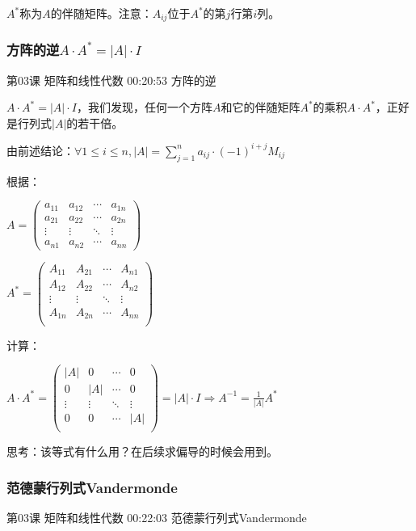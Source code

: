 \documentclass[UTF8]{ctexbook}
\begin{document}
$A^{*}$称为$A$的伴随矩阵。注意：$A_{ij}$位于$A^{*}$的第$j$行第$i$列。

\subsubsection{方阵的逆$A \cdot A^{*} = |A| \cdot I$}

第03课 矩阵和线性代数 00:20:53 方阵的逆

$A \cdot A^{*} = |A| \cdot I$，我们发现，任何一个方阵$A$和它的伴随矩阵$A^{*}$的乘积$A \cdot A^{*}$，正好是行列式$|A|$的若干倍。


由前述结论：$\forall 1 \leq i \leq n, |A|= \sum_{j=1}^{n} a_{ij} \cdot (-1)^{i+j} M_{ij}$

根据：

$A=
\begin{pmatrix}
a_{11} & a_{12} & \cdots & a_{1n} \\
a_{21} & a_{22}  & \cdots & a_{2n} \\
\vdots & \vdots  & \ddots & \vdots \\
a_{n1} & a_{n2}  & \cdots & a_{nn}
\end{pmatrix}$ \quad

$A^{*}=
\begin{pmatrix}
A_{11} & A_{21} & \cdots & A_{n1} \\
A_{12} & A_{22} & \cdots & A_{n2} \\
\vdots & \vdots & \ddots & \vdots \\
A_{1n} & A_{2n} & \cdots & A_{nn} \\
\end{pmatrix}$

计算：

$A \cdot A^{*}=
\begin{pmatrix}
|A| & 0 & \cdots & 0 \\
0 & |A| & \cdots & 0 \\
\vdots & \vdots & \ddots & \vdots \\
0 & 0 & \cdots & |A| \\
\end{pmatrix}
=|A| \cdot I \Rightarrow A^{-1}=\frac{1}{|A|}A^{*}$

思考：该等式有什么用？在后续求偏导的时候会用到。

\subsubsection{范德蒙行列式Vandermonde}

第03课 矩阵和线性代数 00:22:03 范德蒙行列式Vandermonde
\end{document}
